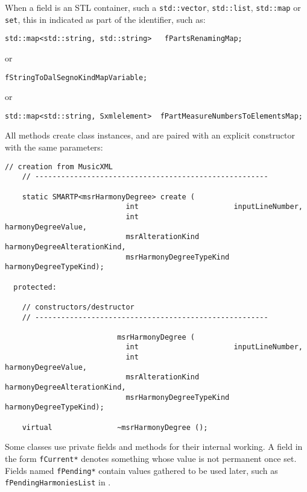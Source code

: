 When a field is an STL container, such a {\tt std::vector}, {\tt std::list}, {\tt std::map} or {\tt set}, this in indicated as part of the identifier, such as:
\begin{lstlisting}[language=CPlusPlus]
    std::map<std::string, std::string>   fPartsRenamingMap;
\end{lstlisting}
or
\begin{lstlisting}[language=CPlusPlus]
                          fStringToDalSegnoKindMapVariable;
\end{lstlisting}
or
\begin{lstlisting}[language=CPlusPlus]
    std::map<std::string, Sxmlelement>  fPartMeasureNumbersToElementsMap;
\end{lstlisting}

All  methods create class   instances, and are paired with an explicit constructor with the same parameters:
\begin{lstlisting}[language=CPlusPlus]
    // creation from MusicXML
    // ------------------------------------------------------

    static SMARTP<msrHarmonyDegree> create (
                            int                      inputLineNumber,
                            int                      harmonyDegreeValue,
                            msrAlterationKind        harmonyDegreeAlterationKind,
                            msrHarmonyDegreeTypeKind harmonyDegreeTypeKind);

  protected:

    // constructors/destructor
    // ------------------------------------------------------

                          msrHarmonyDegree (
                            int                      inputLineNumber,
                            int                      harmonyDegreeValue,
                            msrAlterationKind        harmonyDegreeAlterationKind,
                            msrHarmonyDegreeTypeKind harmonyDegreeTypeKind);

    virtual               ~msrHarmonyDegree ();
\end{lstlisting}

Some classes use private fields and methods for their internal working. A field in the form {\tt fCurrent*} denotes something whose value is not permanent once set. Fields named {\tt fPending*} contain values gathered to be used later, such as {\tt fPendingHarmoniesList} in .


